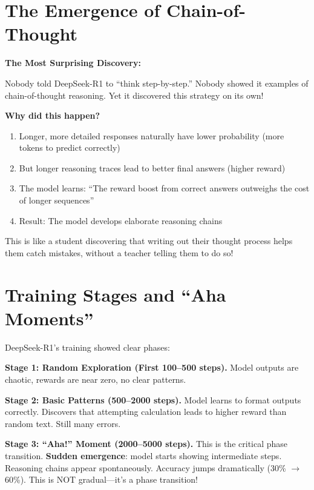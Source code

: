 \begin{chapterenv}
\section{The Emergence of Chain-of-Thought}

\begin{infobox}
\textbf{The Most Surprising Discovery:}

Nobody told DeepSeek-R1 to ``think step-by-step.'' Nobody showed it examples of chain-of-thought reasoning. Yet it discovered this strategy on its own!

\textbf{Why did this happen?}

\begin{enumerate}[nosep]
    \item Longer, more detailed responses naturally have lower probability (more tokens to predict correctly)
    \item But longer reasoning traces lead to better final answers (higher reward)
    \item The model learns: ``The reward boost from correct answers outweighs the cost of longer sequences''
    \item Result: The model develops elaborate reasoning chains
\end{enumerate}

This is like a student discovering that writing out their thought process helps them catch mistakes, without a teacher telling them to do so!
\end{infobox}

\section{Training Stages and ``Aha Moments''}

DeepSeek-R1's training showed clear phases:

\textbf{Stage 1: Random Exploration (First 100--500 steps).} Model outputs are chaotic, rewards are near zero, no clear patterns.

\textbf{Stage 2: Basic Patterns (500--2000 steps).} Model learns to format outputs correctly. Discovers that attempting calculation leads to higher reward than random text. Still many errors.

\textbf{Stage 3: ``Aha!'' Moment (2000--5000 steps).} This is the critical phase transition. \textbf{Sudden emergence}: model starts showing intermediate steps. Reasoning chains appear spontaneously. Accuracy jumps dramatically (30\% $\to$ 60\%). This is NOT gradual---it's a phase transition!


\end{chapterenv}
